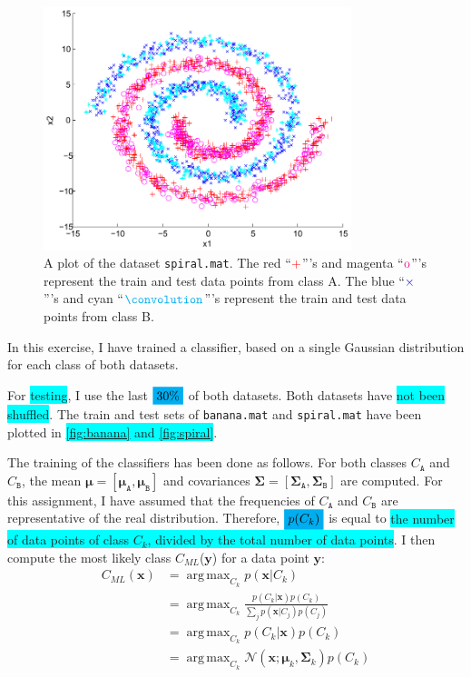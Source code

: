 \documentclass[a4paper,11pt]{article}
\DeclareMathOperator*{\argmax}{arg\,max}
\newcommand{\V}[1]{\ensuremath{\mathbf{#1}}}
\newcommand{\cA}{\ensuremath{C_\mathtt{A}}}
\newcommand{\cB}{\ensuremath{C_\mathtt{B}}}
\newcommand{\ck}{\ensuremath{C_k}}
\newcommand{\cML}{\ensuremath{C_{ML}}}
\newcommand{\muA}{\ensuremath{\boldsymbol{\mu}_\mathtt{A}}}
\newcommand{\muB}{\ensuremath{\boldsymbol{\mu}_\mathtt{B}}}
\newcommand{\muk}{\ensuremath{\boldsymbol{\mu}_k}}
\newcommand{\mean}{\ensuremath{\boldsymbol{\mu}}}
\newcommand{\cov}{\ensuremath{\boldsymbol{\Sigma}}}
\newcommand{\covA}{\ensuremath{\boldsymbol{\Sigma}_\mathtt{A}}}
\newcommand{\covB}{\ensuremath{\boldsymbol{\Sigma}_\mathtt{B}}}
\newcommand{\covk}{\ensuremath{\boldsymbol{\Sigma}_k}}
\newcommand{\hl}[1]{\colorbox{cyan}{#1}}
\newcommand{\mhl}[1]{\mathchoice%
  {\colorbox{cyan}{$\displaystyle#1$}}%
  {\colorbox{cyan}{$\textstyle#1$}}%
  {\colorbox{cyan}{$\scriptstyle#1$}}%
  {\colorbox{cyan}{$\scriptscriptstyle#1$}}}
\begin{document}
\begin{figure}
\begin{center}
\caption{A plot of the dataset \texttt{spiral.mat}.  The red ``$\color{red}+$'''s and magenta ``$\color{magenta}\mbox{o}$'''s represent the train and test data points from class A.  The blue ``$\color{blue}\times$'''s and cyan ``$\color{cyan}\convolution$'''s represent the train and test data points from class B.}
\label{fig:spiral}
\includegraphics[width=0.8\textwidth]{spiral}
\end{center}
\end{figure}

In this exercise, I have trained a classifier, based on a single Gaussian distribution for each class of both datasets.

For \hl{testing}, I use the last $\mhl{30 \%}$ of both datasets.  Both datasets have \hl{not been shuffled}.  The train and test sets of \texttt{banana.mat} and \texttt{spiral.mat} have been plotted in \hl{\autoref{fig:banana} and \autoref{fig:spiral}}.

The training of the classifiers has been done as follows.  For both classes $\cA$ and $\cB$, the mean $\mean = [\muA, \muB]$ and covariances $\cov = [\covA, \covB]$ are computed.  For this assignment, I have assumed that the frequencies of $\cA$ and $\cB$ are representative of the real distribution.  Therefore, $\mhl{p(\ck)}$ is equal to \hl{the number of data points of class $\ck$, divided by the total number of data points}.  I then compute the most likely class \cML(\V{y}) for a data point $\V{y}$:
\begin{align*}
\cML(\V{x}) &= \argmax_{\ck} p(\V{x} | \ck) \\
    &= \argmax_{\ck} \frac{p(\ck | \V{x}) p(\ck)}{\sum_j p(\V{x} | C_j) p(C_j)} \\
    &= \argmax_{\ck} p(\ck | \V{x}) p(\ck) \\
    &= \argmax_{\ck} \mathcal{N}(\V{x} ; \muk, \covk) p(\ck)
\end{align*}
\end{document}
